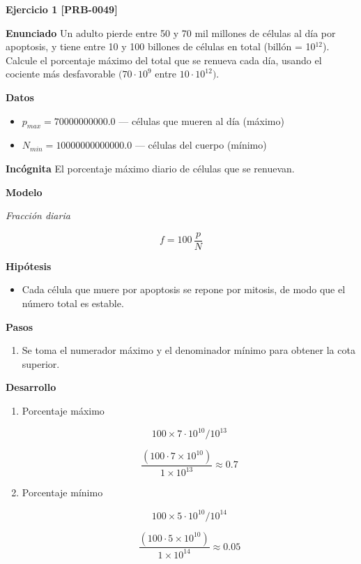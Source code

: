 \documentclass{book}
\begin{document}
\noindent\textbf{Ejercicio 1 [PRB-0049]}

\noindent\textbf{Enunciado}
Un adulto pierde entre 50 y 70 mil millones de células al día por apoptosis, y tiene entre 10 y 100 billones de células en total (billón = 10\({}^{12}\)). Calcule el porcentaje máximo del total que se renueva cada día, usando el cociente más desfavorable \((70\cdot10^{9}\) entre \(10\cdot10^{12})\).


\noindent\textbf{Datos}
\begin{itemize}
\item $p_{max} = 70000000000.0$ — células que mueren al día (máximo)
\item $N_{min} = 10000000000000.0$ — células del cuerpo (mínimo)
\end{itemize}

\noindent\textbf{Incógnita}
El porcentaje máximo diario de células que se renuevan.


\noindent\textbf{Modelo}

\noindent\textit{Fracción diaria}

\[
f = 100\,\frac{p}{N}
\]

\noindent\textbf{Hipótesis}
\begin{itemize}
\item Cada célula que muere por apoptosis se repone por mitosis, de modo que el número total es estable.
\end{itemize}

\noindent\textbf{Pasos}
\begin{enumerate}
\item
Se toma el numerador máximo y el denominador mínimo para obtener la cota superior.

\end{enumerate}

\noindent\textbf{Desarrollo}
\begin{enumerate}
\item
Porcentaje máximo


\[
100 \times 7\cdot10^{10} / 10^{13}
\]

\[
\frac{\left(100\cdot 7\times 10^{10}\right)}{1\times 10^{13}} \approx 0.7
\]
\item
Porcentaje mínimo


\[
100 \times 5\cdot10^{10} / 10^{14}
\]

\[
\frac{\left(100\cdot 5\times 10^{10}\right)}{1\times 10^{14}} \approx 0.05
\]
\end{enumerate}
\end{document}
